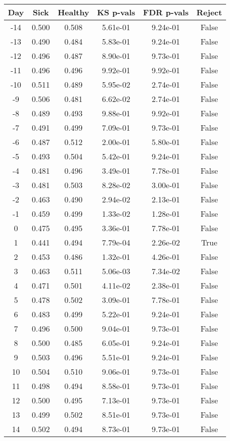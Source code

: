 \begin{tabular}{c|c|c|c|c|c}
Day &  Sick & Healthy &  KS p-vals & FDR p-vals & Reject\\
\hline
-14 & 0.500 &   0.508 &   5.61e-01 &   9.24e-01 &  False\\
-13 & 0.490 &   0.484 &   5.83e-01 &   9.24e-01 &  False\\
-12 & 0.496 &   0.487 &   8.90e-01 &   9.73e-01 &  False\\
-11 & 0.496 &   0.496 &   9.92e-01 &   9.92e-01 &  False\\
-10 & 0.511 &   0.489 &   5.95e-02 &   2.74e-01 &  False\\
 -9 & 0.506 &   0.481 &   6.62e-02 &   2.74e-01 &  False\\
 -8 & 0.489 &   0.493 &   9.88e-01 &   9.92e-01 &  False\\
 -7 & 0.491 &   0.499 &   7.09e-01 &   9.73e-01 &  False\\
 -6 & 0.487 &   0.512 &   2.00e-01 &   5.80e-01 &  False\\
 -5 & 0.493 &   0.504 &   5.42e-01 &   9.24e-01 &  False\\
 -4 & 0.481 &   0.496 &   3.49e-01 &   7.78e-01 &  False\\
 -3 & 0.481 &   0.503 &   8.28e-02 &   3.00e-01 &  False\\
 -2 & 0.463 &   0.490 &   2.94e-02 &   2.13e-01 &  False\\
 -1 & 0.459 &   0.499 &   1.33e-02 &   1.28e-01 &  False\\
  0 & 0.475 &   0.495 &   3.36e-01 &   7.78e-01 &  False\\
  1 & 0.441 &   0.494 &   7.79e-04 &   2.26e-02 &   True\\
  2 & 0.453 &   0.486 &   1.32e-01 &   4.26e-01 &  False\\
  3 & 0.463 &   0.511 &   5.06e-03 &   7.34e-02 &  False\\
  4 & 0.471 &   0.501 &   4.11e-02 &   2.38e-01 &  False\\
  5 & 0.478 &   0.502 &   3.09e-01 &   7.78e-01 &  False\\
  6 & 0.483 &   0.499 &   5.22e-01 &   9.24e-01 &  False\\
  7 & 0.496 &   0.500 &   9.04e-01 &   9.73e-01 &  False\\
  8 & 0.500 &   0.485 &   6.05e-01 &   9.24e-01 &  False\\
  9 & 0.503 &   0.496 &   5.51e-01 &   9.24e-01 &  False\\
 10 & 0.504 &   0.510 &   9.06e-01 &   9.73e-01 &  False\\
 11 & 0.498 &   0.494 &   8.58e-01 &   9.73e-01 &  False\\
 12 & 0.500 &   0.495 &   7.13e-01 &   9.73e-01 &  False\\
 13 & 0.499 &   0.502 &   8.51e-01 &   9.73e-01 &  False\\
 14 & 0.502 &   0.494 &   8.73e-01 &   9.73e-01 &  False\\
\end{tabular}